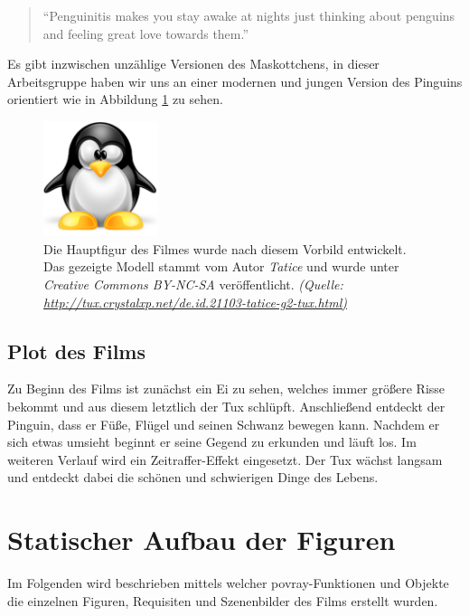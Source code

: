 \documentclass[11pt,parskip]{scrartcl}
\begin{document}
\begin{quote}
  \enquote{Penguinitis makes you stay awake at nights just thinking about
    penguins and feeling great love towards them.} \cite{tuxstory}
\end{quote}

Es gibt inzwischen unzählige Versionen des Maskottchens, in dieser
Arbeitsgruppe haben wir uns an einer modernen und jungen Version des Pinguins
orientiert wie in Abbildung \ref{fig:taticetux} zu sehen.

\begin{figure}[htbp]
  \centering
  \includegraphics[width=0.3\textwidth]{./fig/tatice-g2-tux.pdf}
  \caption{
    Die Hauptfigur des Filmes wurde nach diesem Vorbild entwickelt. Das
    gezeigte Modell stammt vom Autor \emph{Tatice} und wurde unter
    \emph{Creative Commons BY-NC-SA} veröffentlicht.
    \emph{
      (Quelle: \url{http://tux.crystalxp.net/de.id.21103-tatice-g2-tux.html)}
    }
  }
  \label{fig:taticetux}
\end{figure}


\subsection{Plot des Films}
Zu Beginn des Films ist zunächst ein Ei zu sehen, welches immer größere Risse
bekommt und aus diesem letztlich der Tux schlüpft. Anschließend entdeckt der
Pinguin, dass er Füße, Flügel und seinen Schwanz bewegen kann. Nachdem er sich
etwas umsieht beginnt er seine Gegend zu erkunden und läuft los. Im weiteren
Verlauf wird ein Zeitraffer-Effekt eingesetzt. Der Tux wächst langsam und
entdeckt dabei die schönen und schwierigen Dinge des Lebens.


\newpage

\section{Statischer Aufbau der Figuren}
Im Folgenden wird beschrieben mittels welcher povray-Funktionen und Objekte die
einzelnen Figuren, Requisiten und Szenenbilder des Films erstellt wurden.
\end{document}
